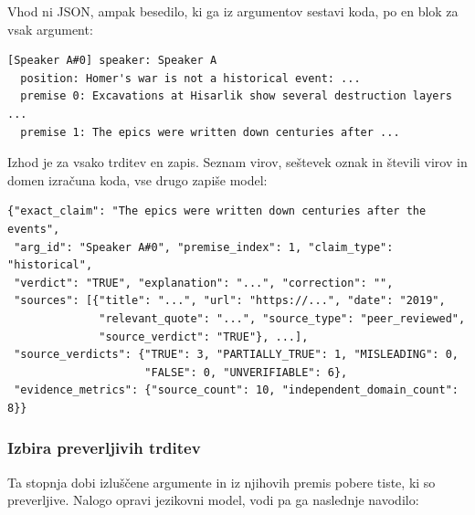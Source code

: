 \documentclass[a4paper, 12pt]{book}
\begin{document}
Vhod ni JSON, ampak besedilo, ki ga iz argumentov sestavi koda, po en blok za
vsak argument:

\begin{lstlisting}[basicstyle=\ttfamily\scriptsize,breaklines=true]
[Speaker A#0] speaker: Speaker A
  position: Homer's war is not a historical event: ...
  premise 0: Excavations at Hisarlik show several destruction layers ...
  premise 1: The epics were written down centuries after ...
\end{lstlisting}

Izhod je za vsako trditev en zapis. Seznam virov, seštevek oznak in števili virov
in domen izračuna koda, vse drugo zapiše model:

\begin{lstlisting}[basicstyle=\ttfamily\scriptsize,breaklines=true]
{"exact_claim": "The epics were written down centuries after the events",
 "arg_id": "Speaker A#0", "premise_index": 1, "claim_type": "historical",
 "verdict": "TRUE", "explanation": "...", "correction": "",
 "sources": [{"title": "...", "url": "https://...", "date": "2019",
              "relevant_quote": "...", "source_type": "peer_reviewed",
              "source_verdict": "TRUE"}, ...],
 "source_verdicts": {"TRUE": 3, "PARTIALLY_TRUE": 1, "MISLEADING": 0,
                     "FALSE": 0, "UNVERIFIABLE": 6},
 "evidence_metrics": {"source_count": 10, "independent_domain_count": 8}}
\end{lstlisting}

\subsubsection{Izbira preverljivih trditev}
\label{ssec:claim-extraction-fc}

Ta stopnja dobi izluščene argumente in iz njihovih premis pobere tiste, ki so
preverljive. Nalogo opravi jezikovni model, vodi pa ga naslednje navodilo:
\end{document}

